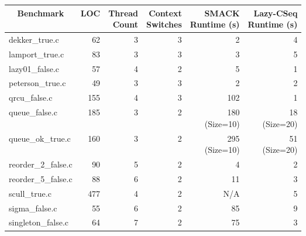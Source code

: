 \begin{table}[ht]
\centering
\begin{tabular}{|l|r|r|r|r|r|}
\hline 
\multicolumn{1}{|c|}{\bfseries{Benchmark}} & 
 \multicolumn{1}{c|}{\bfseries{LOC}} &
 \specialcell{c}{\bfseries{Thread}\\\bfseries{Count}} & 
 \specialcell{c}{\bfseries{Context}\\\bfseries{Switches}} &
 \specialcell{c}{\bfseries{SMACK}\\\bfseries{Runtime (s)}} &
 \specialcell{c}{\bfseries{Lazy-CSeq}\\\bfseries{Runtime (s)}} \\
\hline\hline
dekker\_true.c             & 62  & 3       & 3            & 2             & 4            \\
\hline
lamport\_true.c            & 83  & 3       & 3            & 3             & 5            \\
\hline
lazy01\_false.c            & 57  & 4       & 2            & 5             & 1            \\
\hline
peterson\_true.c           & 49  & 3       & 3            & 2             & 2            \\
\hline
qrcu\_false.c              & 155 & 4       & 3            & 102           & 1            \\
\hline
queue\_false.c             & 185 & 3       & 2            & \specialcell[c]{r}{180\\(Size=10)} &
                                                                \specialcell[c]{r}{18\\(Size=20)} \\
\hline
queue\_ok\_true.c          & 160 & 3       & 2            & \specialcell[c]{r}{295\\(Size=10)} &
                                                                \specialcell[c]{r}{51\\(Size=20)} \\
\hline
reorder\_2\_false.c        & 90  & 5       & 2            & 4             & 2            \\
\hline
reorder\_5\_false.c        & 88  & 6       & 2            & 11            & 3            \\
\hline
scull\_true.c              & 477 & 4       & 2            & N/A             & 5            \\
\hline
sigma\_false.c             & 55  & 6       & 2            & 85            & 9            \\
\hline
singleton\_false.c         & 64  & 7       & 2            & 75            & 3            \\

\end{tabular}
\end{table}
